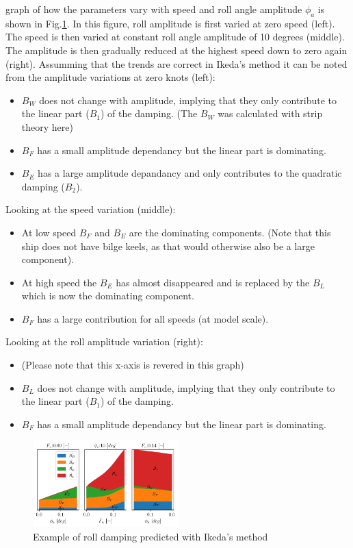 graph of how the parameters vary with speed and roll angle amplitude
$\phi_a$ is shown in Fig.\ref{fig:ikeda_generic}. In this
figure, roll amplitude is first varied at zero speed (left). The speed
is then varied at constant roll angle amplitude of 10 degrees (middle).
The amplitude is then gradually reduced at the highest speed down to
zero again (right).
\quad Assumming that the trends are correct in Ikeda's method it can be
noted from the amplitude variations at zero knots (left):
\begin{itemize}
\item $B_W$ does not change with amplitude, implying that they only contribute to the linear part ($B_1$) of the damping. (The $B_W$ was calculated with strip theory here)
\item $B_F$ has a small amplitude dependancy but the linear part is dominating.
\item $B_E$ has a large amplitude depandancy and only contributes to the quadratic damping ($B_2$)\citep{7505983/4AFVVGNT}.
\end{itemize}
\quad Looking at the speed variation (middle):
\begin{itemize}
\item At low speed $B_F$ and $B_E$ are the dominating components. (Note that this ship does not have bilge keels, as that would otherwise also be a large component).
\item At high speed the $B_E$ has almost disappeared and is replaced by the $B_L$ which is now the dominating component.
\item $B_F$ has a large contribution for all speeds (at model scale).
\end{itemize}
\quad Looking at the roll amplitude variation (right):
\begin{itemize}
\item (Please note that this x-axis is revered in this graph)
\item $B_L$ does not change with amplitude, implying that they only contribute to the linear part ($B_1$) of the damping.
\item $B_F$ has a small amplitude dependancy but the linear part is dominating.
\end{itemize}
\begin{figure}[H]
\begin{center}\includegraphics[width = 0.5\textwidth]{figures/ikeda_generic.pdf}\end{center}
\vspace{-1cm}
\caption{Example of roll damping predicted with Ikeda's method}
\label{fig:ikeda_generic}
\end{figure}
